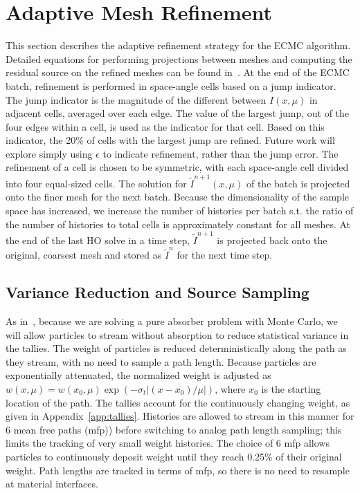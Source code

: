 \section{Adaptive Mesh Refinement}
\label{app:refinement}
This section describes the adaptive refinement strategy for the ECMC algorithm.
Detailed equations for performing projections between meshes and computing the residual source on
the refined meshes can be found in~\cite{jake}.  At the end of the ECMC batch,
refinement is performed in space-angle cells based on a jump indicator.  The jump
indicator is the magnitude of the different between $I(x,\mu)$ in adjacent cells,
averaged over each edge.  The value of the largest jump, out of the four edges within a
cell, is used as the
indicator for that cell.  Based on this indicator, the 20\% of cells with the largest jump are
refined.  Future work will explore simply using $\epsilon$ to indicate refinement,
rather than the jump error.  The refinement of a cell is chosen to be symmetric, with each space-angle cell divided into four
equal-sized cells.  The solution for $\tilde{I}^{n+1}(x,\mu)$ of the batch is projected onto
the finer mesh for the next batch. Because the dimensionality of the sample space has
increased, we increase the number of histories per batch s.t. the ratio of the number
of histories to total cells is approximately constant for all meshes.  At the end of the last HO solve in a time step,
$\tilde{I}^{n+1}$ is projected back onto the original, coarsest mesh and stored as
$\tilde{I}^{n}$ for the next time step.



\subsection{Variance Reduction and Source Sampling}


As in~\cite{park}, because we are solving a pure absorber problem with Monte Carlo, we will allow
particles to stream without absorption to reduce statistical 
variance in the tallies.  The weight of particles is reduced deterministically along
the path as they stream, with no need to sample a path length.  Because particles are exponentially attenuated, the normalized weight is
adjusted as $w(x,\mu) = w(x_0,\mu)\exp(-\sigma_t|(x-x_0)/\mu|)$, where $x_0$ is the starting location of the path.  The tallies account
for the continuously changing weight, as given in Appendix~\ref{app:tallies}. Histories are allowed to stream in this manner for 6 mean free paths (mfp))
before switching to analog path length sampling; this limits the tracking of very small weight histories. The choice of 6 mfp allows particles to 
continuously deposit weight until they reach 0.25\% of their original weight.  Path lengths are tracked in terms of mfp, so there is no need to resample at material
interfaces.

